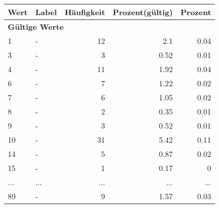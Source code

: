      \begin{longtable}{lXrrr}
     \toprule
     \textbf{Wert} & \textbf{Label} & \textbf{Häufigkeit} & \textbf{Prozent(gültig)} & \textbf{Prozent} \\
     \endhead
     \midrule
     \multicolumn{5}{l}{\textbf{Gültige Werte}}\\
        1 & \multicolumn{1}{X}{-} & %
          \num{12} &
          \num[round-mode=places,round-precision=2]{2.1} &
          \num[round-mode=places,round-precision=2]{0.04} \\
        3 & \multicolumn{1}{X}{-} & %
          \num{3} &
          \num[round-mode=places,round-precision=2]{0.52} &
          \num[round-mode=places,round-precision=2]{0.01} \\
        4 & \multicolumn{1}{X}{-} & %
          \num{11} &
          \num[round-mode=places,round-precision=2]{1.92} &
          \num[round-mode=places,round-precision=2]{0.04} \\
        6 & \multicolumn{1}{X}{-} & %
          \num{7} &
          \num[round-mode=places,round-precision=2]{1.22} &
          \num[round-mode=places,round-precision=2]{0.02} \\
        7 & \multicolumn{1}{X}{-} & %
          \num{6} &
          \num[round-mode=places,round-precision=2]{1.05} &
          \num[round-mode=places,round-precision=2]{0.02} \\
        8 & \multicolumn{1}{X}{-} & %
          \num{2} &
          \num[round-mode=places,round-precision=2]{0.35} &
          \num[round-mode=places,round-precision=2]{0.01} \\
        9 & \multicolumn{1}{X}{-} & %
          \num{3} &
          \num[round-mode=places,round-precision=2]{0.52} &
          \num[round-mode=places,round-precision=2]{0.01} \\
        10 & \multicolumn{1}{X}{-} & %
          \num{31} &
          \num[round-mode=places,round-precision=2]{5.42} &
          \num[round-mode=places,round-precision=2]{0.11} \\
        14 & \multicolumn{1}{X}{-} & %
          \num{5} &
          \num[round-mode=places,round-precision=2]{0.87} &
          \num[round-mode=places,round-precision=2]{0.02} \\
        15 & \multicolumn{1}{X}{-} & %
          \num{1} &
          \num[round-mode=places,round-precision=2]{0.17} &
          \num[round-mode=places,round-precision=2]{0} \\
       ... & ... & ... & ... & ... \\
        89 & \multicolumn{1}{X}{-} & %
          \num{9} &
          \num[round-mode=places,round-precision=2]{1.57} &
          \num[round-mode=places,round-precision=2]{0.03} \\


\end{longtable}
